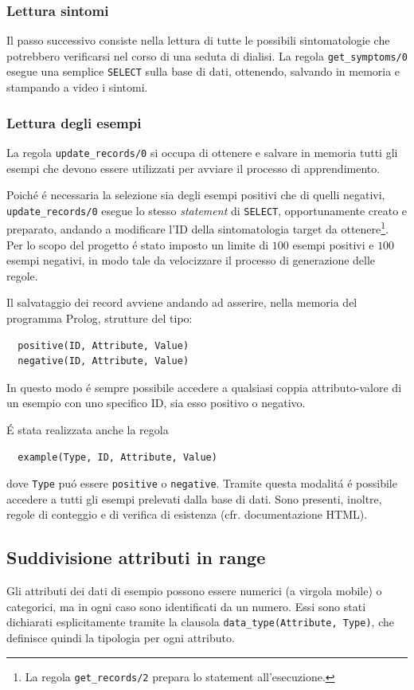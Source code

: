 \documentclass[preprint]{acm_proc_article-sp}
\begin{document}
\subsubsection{Lettura sintomi}
Il passo successivo consiste nella lettura di tutte le possibili sintomatologie che potrebbero verificarsi nel corso di una seduta di dialisi. La regola \verb|get_symptoms/0| esegue una semplice \texttt{SELECT} sulla base di dati, ottenendo, salvando in memoria e stampando a video i sintomi.

\subsubsection{Lettura degli esempi}
La regola \verb|update_records/0| si occupa di ottenere e salvare in memoria tutti gli esempi che devono essere utilizzati per avviare il processo di apprendimento.

Poich\'e \'e necessaria la selezione sia degli esempi positivi che di quelli negativi, \verb|update_records/0| esegue lo stesso \textit{statement} di \texttt{SELECT}, opportunamente creato e preparato, andando a modificare l'ID della sintomatologia target da ottenere\footnote{La regola \verb|get_records/2| prepara lo statement all'esecuzione.}. Per lo scopo del progetto \'e stato imposto un limite di $100$ esempi positivi e $100$ esempi negativi, in modo tale da velocizzare il processo di generazione delle regole.

Il salvataggio dei record avviene andando ad asserire, nella memoria del programma Prolog, strutture del tipo:
\begin{verbatim}
  positive(ID, Attribute, Value)
  negative(ID, Attribute, Value)
\end{verbatim}
In questo modo \'e sempre possibile accedere a qualsiasi coppia attributo-valore di un esempio con uno specifico ID, sia esso positivo o negativo.

\'E stata realizzata anche la regola
\begin{verbatim}
  example(Type, ID, Attribute, Value)
\end{verbatim}
dove \verb|Type| pu\'o essere \verb|positive| o \verb|negative|. Tramite questa modalit\'a \'e possibile accedere a tutti gli esempi prelevati dalla base di dati. Sono presenti, inoltre, regole di conteggio e di verifica di esistenza (cfr. documentazione HTML).

\subsection{Suddivisione attributi in range}
\label{prolog-categories}
Gli attributi dei dati di esempio possono essere numerici (a virgola mobile) o categorici, ma in ogni caso sono identificati da un numero. Essi sono stati dichiarati esplicitamente tramite la clausola \verb|data_type(Attribute, Type)|, che definisce quindi la tipologia per ogni attributo.
\end{document}
